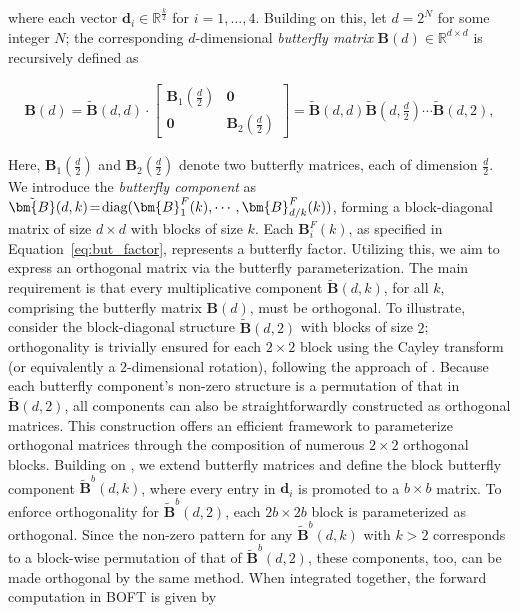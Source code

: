 where each vector $\bm{d}_i\in\mathbb{R}^{\frac{k}{2}}$ for $i=1,\ldots,4$. Building on this, let $d=2^N$ for some integer $N$; the corresponding $d$-dimensional \emph{butterfly matrix} $\bm{B}(d)\in\mathbb{R}^{d\times d}$ is recursively defined as

\begin{equation}
\begin{aligned}
    \!\!\bm{B}(d)=\tilde{\bm{B}}(d,d)\!\cdot\!\begin{bmatrix}
    \bm{B}_1(\frac{d}{2})\!\!\!\!\! & \bm{0} \\
    \bm{0}\!\!\!\!\! &\bm{B}_2(\frac{d}{2})
    \end{bmatrix}= \tilde{\bm{B}}(d,d)\tilde{\bm{B}}(d,\frac{d}{2})\cdots\tilde{\bm{B}}(d,2),
\end{aligned}
\end{equation}

Here, $\bm{B}_1(\frac{d}{2})$ and $\bm{B}_2(\frac{d}{2})$ denote two butterfly matrices, each of dimension $\frac{d}{2}$. We introduce the \emph{butterfly component} as $\thickmuskip=2mu \medmuskip=2mu \tilde{\bm{B}}(d,k)=\text{diag}(\bm{B}^F_1(k),\cdots,\bm{B}^F_{d/k}(k))$, forming a block-diagonal matrix of size $d\times d$ with blocks of size $k$. Each $\bm{B}^F_i(k)$, as specified in Equation~\ref{eq:but_factor}, represents a butterfly factor. Utilizing this, we aim to express an orthogonal matrix via the butterfly parameterization. The main requirement is that every multiplicative component $\tilde{\bm{B}}(d,k)$, for all $k$, comprising the butterfly matrix $\bm{B}(d)$, must be orthogonal. To illustrate, consider the block-diagonal structure $\tilde{\bm{B}}(d,2)$ with blocks of size $2$; orthogonality is trivially ensured for each $2\times 2$ block using the Cayley transform (or equivalently a $2$-dimensional rotation), following the approach of \cite{liu2021orthogonal,qiu2023controlling}. Because each butterfly component's non-zero structure is a permutation of that in $\tilde{\bm{B}}(d,2)$, all components can also be straightforwardly constructed as orthogonal matrices. This construction offers an efficient framework to parameterize orthogonal matrices through the composition of numerous $2\times 2$ orthogonal blocks. Building on \cite{chen2022pixelated}, we extend butterfly matrices and define the block butterfly component $\tilde{\bm{B}}^b(d,k)$, where every entry in $\bm{d}_i$ is promoted to a $b\times b$ matrix. To enforce orthogonality for $\tilde{\bm{B}}^b(d,2)$, each $2b\times 2b$ block is parameterized as orthogonal. Since the non-zero pattern for any $\tilde{\bm{B}}^b(d,k)$ with $k>2$ corresponds to a block-wise permutation of that of $\tilde{\bm{B}}^b(d,2)$, these components, too, can be made orthogonal by the same method. When integrated together, the forward computation in BOFT is given by

